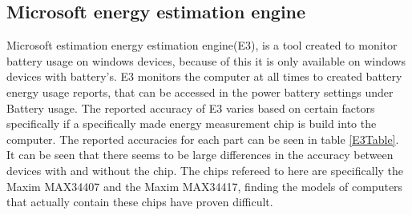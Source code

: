 \subsection*{Microsoft energy estimation engine}
Microsoft estimation energy estimation engine(E3), is a tool created to monitor battery usage on windows devices, because of this it is only available on windows devices with battery's. E3 monitors the computer at all times to created battery energy usage reports, that can be accessed in the power battery settings under Battery usage\cite[p.43]{E3WinHec}. The reported accuracy of E3 varies based on certain factors specifically if a specifically made energy measurement chip is build into the computer. The reported accuracies for each part can be seen in table \cref{E3Table}.
%
It can be seen that there seems to be large differences in the accuracy between devices with and without the chip. The chips refereed to here are specifically the Maxim MAX34407 and the Maxim MAX34417, finding the models of computers that actually contain these chips have proven difficult. 
